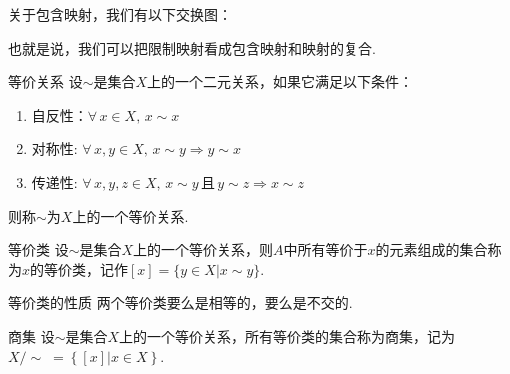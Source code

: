 \begin{remark}
    关于包含映射，我们有以下交换图： \par
    \par

也就是说，我们可以把限制映射看成包含映射和映射的复合.

\begin{definition}{等价关系}
    设$\sim$是集合$X$上的一个二元关系，如果它满足以下条件：
    \begin{enumerate}
        \item 自反性：$\forall\, x\in X,\,x\sim x$
        \item 对称性: $\forall\, x,y\in X,\,x\sim y\Rightarrow y\sim x$
        \item 传递性: $\forall\, x,y,z\in X,\,x\sim y\,\text{且}\,y\sim z\Rightarrow x\sim z$
    \end{enumerate}
    则称$\sim$为$X$上的一个等价关系.
\end{definition}

\begin{definition}{等价类}
    设$\sim$是集合$X$上的一个等价关系，则$A$中所有等价于$x$的元素组成的集合称为$x$的等价类，记作$[x]=\{y\in X|x\sim y\}$.
\end{definition}

\begin{proposition}{等价类的性质}
    两个等价类要么是相等的，要么是不交的.
\end{proposition}

\begin{definition}{商集}
    设$\sim$是集合$X$上的一个等价关系，所有等价类的集合称为商集，记为$X/\sim \;= \left\{[x]|x\in X\right\}$.
\end{definition}





\end{remark}